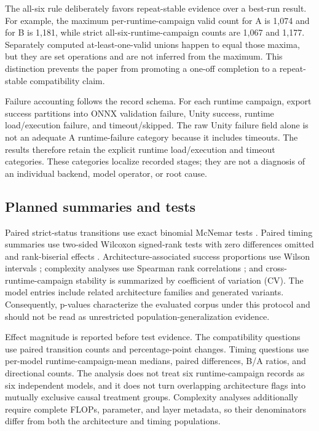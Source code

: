 The all-six rule deliberately favors repeat-stable evidence over a best-run result. For example, the maximum per-runtime-campaign valid count for A is 1,074 and for B is 1,181, while strict all-six-runtime-campaign counts are 1,067 and 1,177. Separately computed at-least-one-valid unions happen to equal those maxima, but they are set operations and are not inferred from the maximum. This distinction prevents the paper from promoting a one-off completion to a repeat-stable compatibility claim.

Failure accounting follows the record schema. For each runtime campaign, export success partitions into ONNX validation failure, Unity success, runtime load/execution failure, and timeout/skipped. The raw Unity failure field alone is not an adequate A runtime-failure category because it includes timeouts. The results therefore retain the explicit runtime load/execution and timeout categories. These categories localize recorded stages; they are not a diagnosis of an individual backend, model operator, or root cause.

\subsection{Planned summaries and tests}
Paired strict-status transitions use exact binomial McNemar tests \citep{mcnemar1947}. Paired timing summaries use two-sided Wilcoxon signed-rank tests with zero differences omitted and rank-biserial effects \citep{wilcoxon1945}. Architecture-associated success proportions use Wilson intervals \citep{wilson1927}; complexity analyses use Spearman rank correlations \citep{spearman1904}; and cross-runtime-campaign stability is summarized by coefficient of variation (CV). The model entries include related architecture families and generated variants. Consequently, p-values characterize the evaluated corpus under this protocol and should not be read as unrestricted population-generalization evidence.

Effect magnitude is reported before test evidence. The compatibility questions use paired transition counts and percentage-point changes. Timing questions use per-model runtime-campaign-mean medians, paired differences, B/A ratios, and directional counts. The analysis does not treat six runtime-campaign records as six independent models, and it does not turn overlapping architecture flags into mutually exclusive causal treatment groups. Complexity analyses additionally require complete FLOPs, parameter, and layer metadata, so their denominators differ from both the architecture and timing populations.

